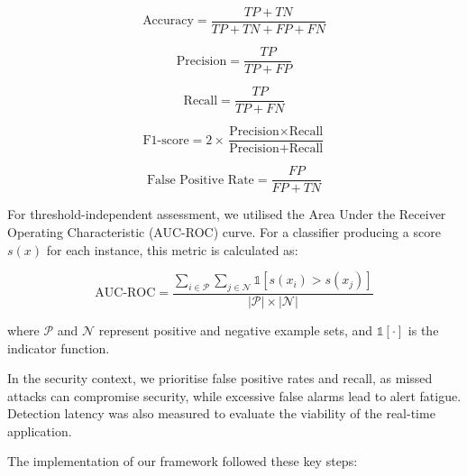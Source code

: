 \begin{equation}
\text{Accuracy} = \frac{TP + TN}{TP + TN + FP + FN}
\end{equation}

\begin{equation}
\text{Precision} = \frac{TP}{TP + FP}
\end{equation}

\begin{equation}
\text{Recall} = \frac{TP}{TP + FN}
\end{equation}

\begin{equation}
\text{F1-score} = 2 \times \frac{\text{Precision} \times \text{Recall}}{\text{Precision} + \text{Recall}}
\end{equation}

\begin{equation}
\text{False Positive Rate} = \frac{FP}{FP + TN}
\end{equation}

For threshold-independent assessment, we utilised the Area Under the Receiver Operating Characteristic (AUC-ROC) curve. For a classifier producing a score $s(x)$ for each instance, this metric is calculated as:

\begin{equation}
\text{AUC-ROC} = \frac{\sum_{i \in \mathcal{P}} \sum_{j \in \mathcal{N}} \mathbb{1}[s(x_i) > s(x_j)]}{|\mathcal{P}| \times |\mathcal{N}|}
\end{equation}

where $\mathcal{P}$ and $\mathcal{N}$ represent positive and negative example sets, and $\mathbb{1}[\cdot]$ is the indicator function.

In the security context, we prioritise false positive rates and recall, as missed attacks can compromise security, while excessive false alarms lead to alert fatigue. Detection latency was also measured to evaluate the viability of the real-time application.

The implementation of our framework followed these key steps:

